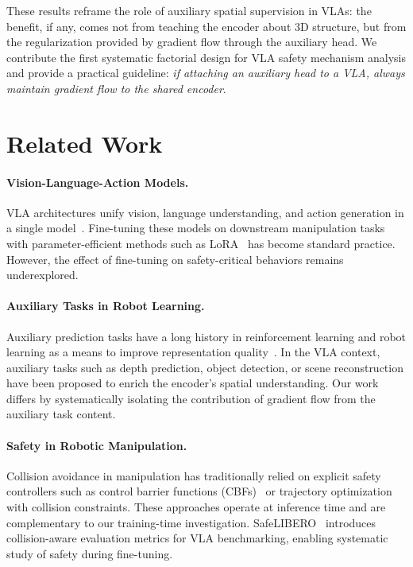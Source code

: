\documentclass[letterpaper]{article}
\begin{document}
These results reframe the role of auxiliary spatial supervision in VLAs: the benefit, if any, comes not from teaching the encoder about 3D structure, but from the regularization provided by gradient flow through the auxiliary head.
We contribute the first systematic factorial design for VLA safety mechanism analysis and provide a practical guideline: \emph{if attaching an auxiliary head to a VLA, always maintain gradient flow to the shared encoder}.


\section{Related Work}
\label{sec:related}

\paragraph{Vision-Language-Action Models.}
VLA architectures unify vision, language understanding, and action generation in a single model~\citep{brohan2023rt2,kim2024openvla,team2024octo}.
Fine-tuning these models on downstream manipulation tasks with parameter-efficient methods such as LoRA~\citep{hu2022lora} has become standard practice.
However, the effect of fine-tuning on safety-critical behaviors remains underexplored.

\paragraph{Auxiliary Tasks in Robot Learning.}
Auxiliary prediction tasks have a long history in reinforcement learning and robot learning as a means to improve representation quality~\citep{jaderberg2017unreal,mirowski2017learning,ye2021auxiliary}.
In the VLA context, auxiliary tasks such as depth prediction, object detection, or scene reconstruction have been proposed to enrich the encoder's spatial understanding.
Our work differs by systematically isolating the contribution of gradient flow from the auxiliary task content.

\paragraph{Safety in Robotic Manipulation.}
Collision avoidance in manipulation has traditionally relied on explicit safety controllers such as control barrier functions (CBFs)~\citep{ames2019control} or trajectory optimization with collision constraints.
These approaches operate at inference time and are complementary to our training-time investigation.
SafeLIBERO~\citep{safelibero2025} introduces collision-aware evaluation metrics for VLA benchmarking, enabling systematic study of safety during fine-tuning.
\end{document}
